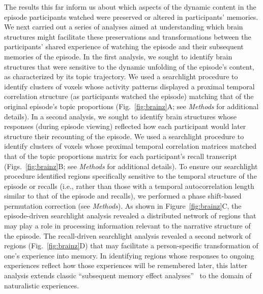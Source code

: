 \documentclass[10pt]{article}
\begin{document}
The results this far inform us about which aspects of the dynamic content in the episode participants watched were preserved or altered in participants' memories.  We next carried out a series of analyses aimed at understanding which brain structures might facilitate these preservations and transformations between the participants' shared experience of watching the episode and their subsequent memories of the episode.  In the first analysis, we sought to identify brain structures that were sensitive to the dynamic unfolding of the episode's content, as characterized by its topic trajectory.  We used a searchlight procedure to identify clusters of voxels whose activity patterns displayed a proximal temporal correlation structure (as participants watched the episode) matching that of the original episode's topic proportions (Fig.~\ref{fig:brainz}A; see \textit{Methods} for additional details).  In a second analysis, we sought to identify brain structures whose responses (during episode viewing) reflected how each participant would later structure their recounting of the episode.  We used a searchlight procedure to identify clusters of voxels whose proximal temporal correlation matrices matched that of the topic proportions matrix for each participant's recall transcript (Figs.~\ref{fig:brainz}B; see \textit{Methods} for additional details).  To ensure our searchlight procedure identified regions specifically sensitive to the temporal structure of the episode or recalls (i.e., rather than those with a temporal autocorrelation length similar to that of the episode and recalls), we performed a phase shift-based permutation correction (see \textit{Methods}). As shown in Figure~\ref{fig:brainz}C, the episode-driven searchlight analysis revealed a distributed network of regions that may play a role in processing information relevant to the narrative structure of the episode.  The recall-driven searchlight analysis revealed a second network of regions (Fig.~\ref{fig:brainz}D) that may facilitate a person-specific transformation of one's experience into memory.  In identifying regions whose responses to ongoing experiences reflect how those experiences will be remembered later, this latter analysis extends classic ``subsequent memory effect analyses''~\citep[e.g.,][]{PallWagn02} to the domain of naturalistic experiences.
\end{document}

